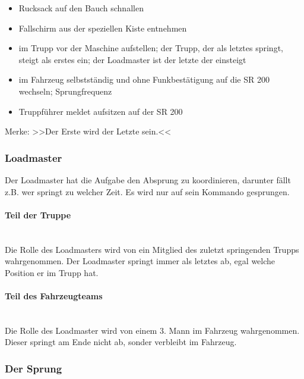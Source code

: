 	\begin{itemize}
		\item Rucksack auf den Bauch schnallen 
		\item  Fallschirm aus der speziellen Kiste entnehmen
		\item  im Trupp vor der Maschine aufstellen; der Trupp, der als letztes springt, steigt als erstes ein; der Loadmaster ist der letzte der einsteigt
		\item im Fahrzeug selbstständig und ohne Funkbestätigung auf die SR 200 wechseln; Sprungfrequenz
		\item  Truppführer meldet aufsitzen auf der SR 200
	\end{itemize}

	\begin{flushright}
		Merke: >>Der Erste wird der Letzte sein.<< 
	\end{flushright}

\subsubsection{Loadmaster}

	Der Loadmaster hat die Aufgabe den Absprung zu koordinieren, darunter fällt z.B. wer springt zu welcher Zeit. Es wird nur auf sein Kommando gesprungen. \\

\paragraph{Teil der Truppe} \ \\
	Die Rolle des Loadmasters wird von ein Mitglied des zuletzt springenden Trupps wahrgenommen. Der Loadmaster springt immer als letztes ab, egal welche Position er im Trupp hat. \\

\paragraph{Teil des Fahrzeugteams} \ \\
	Die Rolle des Loadmaster wird von einem 3. Mann im Fahrzeug wahrgenommen. Dieser springt am Ende nicht ab, sonder verbleibt im Fahrzeug. \\

\subsubsection{Der Sprung}

